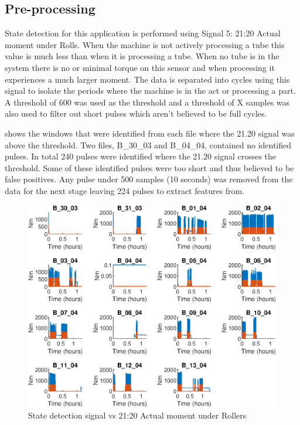 \documentclass[]{article}
\begin{document}
\subsection{Pre-processing}
State detection for this application is performed using Signal 5: 21:20 Actual moment under Rolls. When the machine is not actively processing a tube this value is much less than when it is processing a tube. When no tube is in the system there is no or minimal torque on this sensor and when processing it experiences a much larger moment.
The data is separated into cycles using this signal to isolate the periods where the machine is in the act or processing a part. A threshold of 600 was used as the threshold and a threshold of X samples was also used to filter out short pulses which aren't believed to be full cycles.

 shows the windows that were identified from each file where the 21.20 signal was above the threshold. Two files, B\_30\_03 and B\_04\_04, contained no identified pulses. In total 240 pulses were identified where the 21.20 signal crosses the threshold. Some of these identified pulses were too short and thus believed to be false positives. Any pulse under 500 samples (10 seconds) was removed from the data for the next stage leaving 224 pulses to extract features from.

\begin{figure}[H]
    \centering
    \includegraphics[width=\textwidth, height=\textheight, keepaspectratio]{figures/StateDetectionFig.eps}
    \caption{State detection signal vs 21:20 Actual moment under Rollers}
    \label{fig:StateDetection}
\end{figure}
\end{document}
